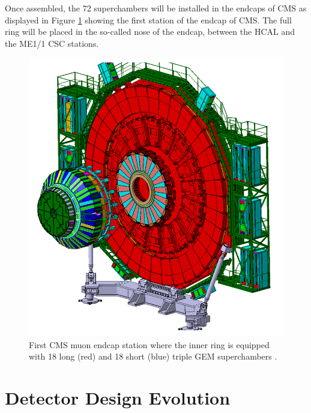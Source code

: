     Once assembled, the 72 superchambers will be installed in the endcaps of CMS as displayed in Figure \ref{fig:II-1-wheel} showing the first station of the endcap of CMS. The full ring will be placed in the so-called nose of the endcap, between the HCAL and the ME1/1 CSC stations.

    \begin{figure}[p]
      \centering
      \includegraphics[width=\textwidth]{img/II-1-gem/wheel.png}
      \caption{First CMS muon endcap station where the inner ring is equipped with 18 long (red) and 18 short (blue) triple GEM superchambers \cite{Colaleo:2021453}.}
      \label{fig:II-1-wheel}
    \end{figure}

  \section{Detector Design Evolution}


